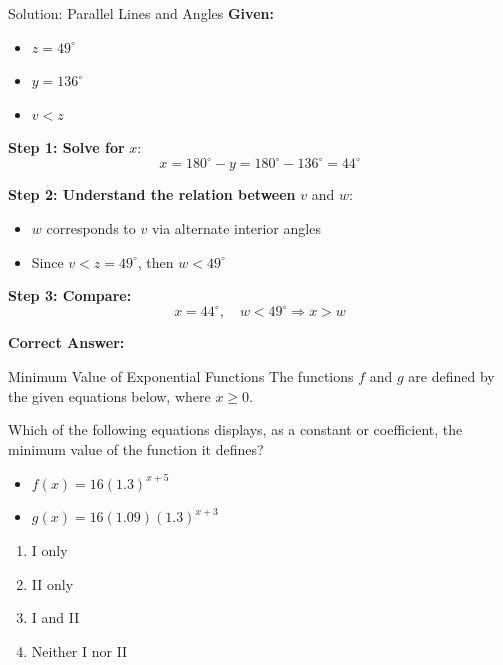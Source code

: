 \documentclass{beamer}
\begin{document}
\begin{frame}{Solution: Parallel Lines and Angles}
\small
\textbf{Given:}
\begin{itemize}
    \item $z = 49^\circ$
    \item $y = 136^\circ$
    \item $v < z$
\end{itemize}

\textbf{Step 1: Solve for } $x$:
\[
x = 180^\circ - y = 180^\circ - 136^\circ = 44^\circ
\]

\textbf{Step 2: Understand the relation between } $v$ and $w$:
\begin{itemize}
    \item $w$ corresponds to $v$ via alternate interior angles
    \item Since $v < z = 49^\circ$, then $w < 49^\circ$
\end{itemize}

\textbf{Step 3: Compare:}
\[
x = 44^\circ,\quad w < 49^\circ \Rightarrow \boxed{x > w}
\]

\textbf{Correct Answer:} 
\end{frame}

\begin{frame}{Minimum Value of Exponential Functions}
\small
The functions $f$ and $g$ are defined by the given equations below, where $x \geq 0$.

Which of the following equations displays, as a constant or coefficient, the minimum value of the function it defines?

\begin{itemize}
    \item[I.] $f(x) = 16(1.3)^{x+5}$
    \item[II.] $g(x) = 16(1.09)(1.3)^{x+3} $
\end{itemize}

\begin{enumerate}
    \item[A.] I only
    \item[B.] II only
    \item[C.] I and II
    \item[D.] Neither I nor II
\end{enumerate}
\end{frame}
\end{document}
